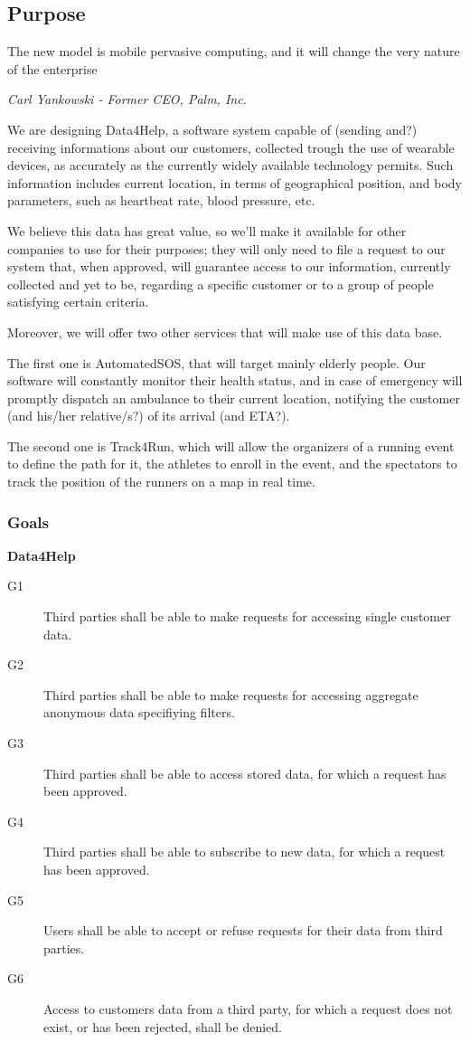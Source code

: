 \documentclass[../main.tex]{subfiles}
\begin{document}
\subsection{Purpose}

\epigraph{The new model is mobile pervasive computing, and it will change the very nature of the enterprise}{\textit{Carl Yankowski - Former CEO, Palm, Inc.}}
We are designing Data4Help, a software system capable of (sending and?) receiving informations about our customers, collected trough the use of wearable devices, as accurately as the currently widely available technology permits.
Such information includes current location, in terms of geographical position, and body parameters, such as heartbeat rate, blood pressure, etc.

We believe this data has great value, so we'll make it available for other companies to use for their purposes; they will only need to file a request to our system that, when approved, will guarantee access to our information, currently collected and yet to be, regarding a specific customer or to a group of people satisfying certain criteria.

Moreover, we will offer two other services that will make use of this data base.

The first one is AutomatedSOS, that will target mainly elderly people. Our software will constantly monitor their health status, and in case of emergency will promptly dispatch an ambulance to their current location, notifying the customer (and his/her relative/s?) of its arrival (and ETA?).

The second one is Track4Run, which will allow the organizers of a running event to define the path for it, the athletes to enroll in the event, and the spectators to track the position of the runners on a map in real time.


\subsubsection{Goals}

\begin{minipage}{\textwidth}
{\bf Data4Help}
\begin{description}
	\item [G1]  Third parties shall be able to make requests for accessing single customer data.
	\item [G2]  Third parties shall be able to make requests for accessing aggregate anonymous data specifiying filters.
	\item [G3]  Third parties shall be able to access stored data, for which a request has been approved.
	\item [G4]  Third parties shall be able to subscribe to new data, for which a request has been approved.
	\item [G5]  Users shall be able to accept or refuse requests for their data from third parties.
	\item [G6]  Access to customers data from a third party, for which a request does not exist, or has been rejected, shall be denied.
\end{description}
\end{minipage}
\vspace{8mm}
\end{document}
